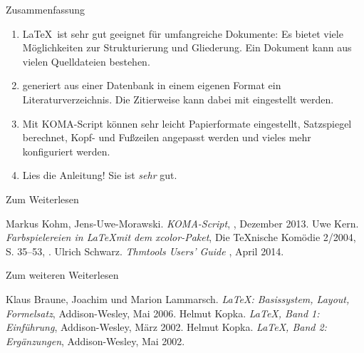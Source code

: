 
\begin{frame}[fragile]{Zusammenfassung}
  \begin{enumerate}
    \item \LaTeX\ ist sehr gut geeignet für \alert{umfangreiche Dokumente}:
      Es bietet viele Möglichkeiten zur \alert{Strukturierung} und
      \alert{Gliederung}. Ein Dokument kann aus
      \alert{vielen Quelldateien} bestehen.
    \item \alert{\BibTeX} generiert aus einer \alert{Datenbank} in einem eigenen Format
      ein \alert{Literaturverzeichnis}. Die \alert{Zitierweise} kann dabei mit
      \lstinline-- eingestellt werden.
    \item Mit \alert{KOMA-Script} können sehr leicht \alert{Papierformate}
      eingestellt, \alert{Satzspiegel}
      berechnet, \alert{Kopf- und Fußzeilen} angepasst werden und vieles
      mehr konfiguriert werden.
    \item \alert{Lies die Anleitung!} Sie ist \emph{sehr} gut.
  \end{enumerate}
\end{frame}

\begin{frame}[fragile]{Zum Weiterlesen}
  \begin{mybib}
      Markus Kohm, Jens-Uwe-Morawski.
      \newblock \emph{KOMA-Script},
      \newblock {}, Dezember 2013.
      Uwe Kern.
      \newblock \emph{Farbspielereien in \LaTeX mit dem xcolor-Paket},
      \newblock Die \TeX nische Komödie 2/2004, S. 35--53,
      \newblock {}.
      Ulrich Schwarz.
      \newblock \emph{Thmtools Users’ Guide}
      \newblock {}, April 2014.
  \end{mybib}
\end{frame}

\begin{frame}[fragile]{Zum weiteren Weiterlesen}
  \begin{mybib}
      Klaus Braune, Joachim und Marion Lammarsch.
      \newblock \emph{\LaTeX: Basissystem, Layout, Formelsatz},
      \newblock Addison-Wesley, Mai 2006.
      Helmut Kopka.
      \newblock \emph{\LaTeX, Band 1: Einführung},
      \newblock Addison-Wesley, März 2002.
      Helmut Kopka.
      \newblock \emph{\LaTeX, Band 2: Ergänzungen},
      \newblock Addison-Wesley, Mai 2002.
  \end{mybib}
\end{frame}


